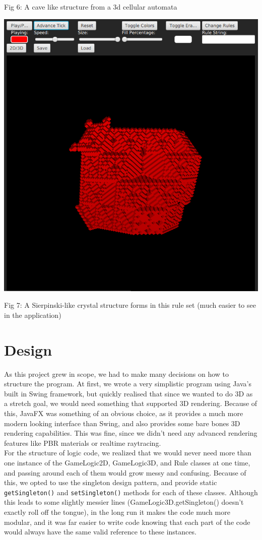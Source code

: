 \documentclass[11pt]{article}
\begin{document}
Fig 6: A cave like structure from a 3d cellular automata
\begin{center}
\includegraphics[width=.9\linewidth]{./Fig7.png}
\end{center}
Fig 7: A Sierpinski-like crystal structure forms in this rule set (much easier
to see in the application)
\section{Design}
\label{sec:org37f2b81}
As this project grew in scope, we had to make many decisions on how to structure
the program.  At first, we wrote a very simplistic program using Java's built in
Swing framework, but quickly realised that since we wanted to do 3D as a stretch
goal, we would need something that supported 3D rendering.  Because of this,
JavaFX was something of an obvious choice, as it provides a much more modern
looking interface than Swing, and also provides some bare bones 3D rendering
capabilities.  This was fine, since we didn't need any advanced rendering
features like PBR materials or realtime raytracing.\\

For the structure of logic code, we realized that we would never need more than
one instance of the GameLogic2D, GameLogic3D, and Rule classes at one time, and
passing around each of them would grow messy and confusing.  Because of this, we
opted to use the singleton design pattern, and provide static \texttt{getSingleton()} and
\texttt{setSingleton()} methods for each of these classes.  Although this leads to some
slightly messier lines (GameLogic3D.getSingleton() doesn't exactly roll off the
tongue), in the long run it makes the code much more modular, and it was far
easier to write code knowing that each part of the code would always have the
same valid reference to these instances.\\
\end{document}
